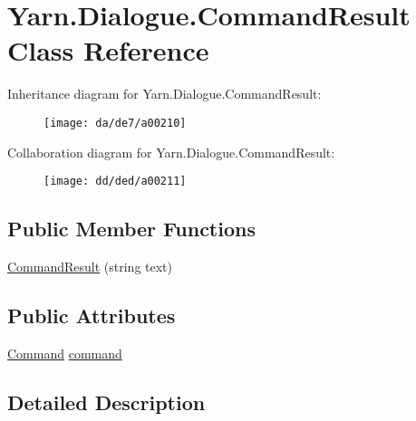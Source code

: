 \hypertarget{a00027}{\section{Yarn.\-Dialogue.\-Command\-Result Class Reference}
\label{a00027}
}


Inheritance diagram for Yarn.\-Dialogue.\-Command\-Result\-:
\nopagebreak
\begin{figure}[H]
\begin{center}
\leavevmode
\texttt{[image: da/de7/a00210]}
\end{center}
\end{figure}


Collaboration diagram for Yarn.\-Dialogue.\-Command\-Result\-:
\nopagebreak
\begin{figure}[H]
\begin{center}
\leavevmode
\texttt{[image: dd/ded/a00211]}
\end{center}
\end{figure}
\subsection*{Public Member Functions}
\begin{DoxyCompactItemize}
\item 
\hyperlink{a00027_a1a553422394fb0c854d1184985f993bb}{Command\-Result} (string text)
\end{DoxyCompactItemize}
\subsection*{Public Attributes}
\begin{DoxyCompactItemize}
\item 
\hyperlink{a00026_d2/d34/a00156}{Command} \hyperlink{a00027_a420ca0984d6e5c33bb761654305c592e}{command}
\end{DoxyCompactItemize}


\subsection{Detailed Description}


